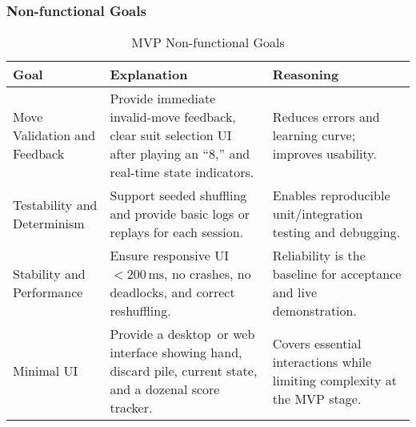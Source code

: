 \documentclass{article}
\begin{document}
    \subsubsection{Non-functional Goals}
    \begin{table}[H]
        \caption{MVP Non-functional Goals}\label{TblMVPNonFunctionalGoals}
        \begin{tabular}{|p{}|p{}|p{}|}
            \hline
            \textbf{Goal} & \textbf{Explanation} & \textbf{Reasoning} \\
            \hline
            Move Validation and Feedback &
            Provide immediate invalid-move feedback, clear suit selection UI after playing an ``8,'' and real-time state indicators. &
            Reduces errors and learning curve; improves usability. \\
            \hline
            Testability and Determinism &
            Support seeded shuffling and provide basic logs or replays for each session. &
            Enables reproducible unit/integration testing and debugging. \\
            \hline
            Stability and Performance &
            Ensure responsive UI \(<200\,\text{ms}\), no crashes, no deadlocks, and correct reshuffling. &
            Reliability is the baseline for acceptance and live demonstration. \\
            \hline
            Minimal UI &
            Provide a desktop~or web interface showing hand, discard pile, current state, and a dozenal score tracker. &
            Covers essential interactions while limiting complexity at the MVP stage. \\
            \hline
        \end{tabular}
    \end{table}
\end{document}
